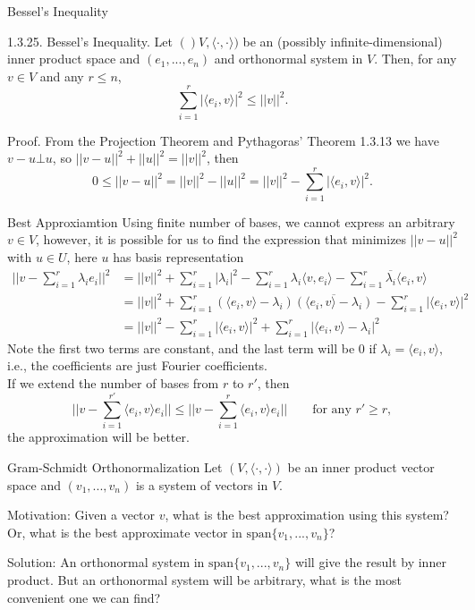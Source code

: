 \documentclass[hyperref={pdfpagelabels=true}]{beamer}
\newcommand{\<}{\langle}
\renewcommand{\>}{\rangle}
\begin{document}
\begin{frame}{Bessel's Inequality}
    \begin{block}{1.3.25. Bessel's Inequality.} Let $()V,\<\cdot,\cdot\>)$ be an (possibly infinite-dimensional) inner product space and $(e_{1},...,e_{n})$ and orthonormal system in $V$. Then, for any $v \in V$ and any $r \leq n$,
        \[\sum_{i = 1}^{r}|\<e_{i},v\>|^{2}\leq ||v||^{2}.\]
    \end{block}
    \begin{block}{Proof.}
        From the Projection Theorem and Pythagoras' Theorem 1.3.13 we have $v-u \bot u$, so $||v-u||^{2}+||u||^{2} = ||v||^{2}$, then
        \[0 \leq ||v-u||^{2} = ||v||^{2}-||u||^{2} = ||v||^{2}-\sum_{i = 1}^{r}|\<e_{i},v\>|^{2}.\]
    \end{block}
\end{frame}
\begin{frame}{Best Approxiamtion}
    Using finite number of bases, we cannot express an arbitrary $v \in V$, however, it is possible for us to find the expression that minimizes $||v-u||^{2}$ with $u \in U$, here $u$ has basis representation
    \[
        \begin{aligned}
            ||v-\sum_{i = 1}^{r}\lambda_{i}e_{i}||^{2}&=||v||^{2}+\sum_{i = 1}^{r}|\lambda_{i}|^{2}-\sum_{i = 1}^{r}\lambda_{i}\<v,e_{i}\>-\sum_{i = 1}^{r}\overline{\lambda_{i}}\<e_{i},v\> \\
            &=||v||^{2}+\sum_{i = 1}^{r}(\<e_{i},v\>-\lambda_{i})\overline{(\<e_{i},v\>-\lambda_{i})}-\sum_{i = 1}^{r}|\<e_{i},v\>|^{2}\\
            &=||v||^{2}-\sum_{i = 1}^{r}|\<e_{i},v\>|^{2} +\sum_{i = 1}^{r}|\<e_{i},v\>-\lambda_{i}|^{2}
        \end{aligned}
    \]
    Note the first two terms are constant, and the last term will be 0 if $\lambda_{i} = \<e_{i},v\>,$ i.e., the coefficients are just Fourier coefficients.\\
    If we extend the number of bases from $r$ to $r'$, then 
    \[||v-\sum_{i = 1}^{r'}\<e_{i},v\>e_{i}||\leq||v-\sum_{i = 1}^{r}\<e_{i},v\>e_{i}||\qquad \text{for any } r' \geq r,\]
    the approximation will be better.
\end{frame}
\begin{frame}{Gram-Schmidt Orthonormalization}
    Let $(V,\<\cdot,\cdot\>)$ be an inner product vector space and $(v_{1},...,v_{n})$ is a system of vectors in $V$.\\
    \begin{block}{Motivation:}
        Given a vector $v$, what is the best approximation using this system? Or, what is the best approximate vector in $\text{span}\{v_{1},...,v_{n}\}$?
    \end{block}
    \begin{block}{Solution:}
        An orthonormal system in $\text{span}\{v_{1},...,v_{n}\}$ will give the result by inner product. But an orthonormal system will be arbitrary, what is the most convenient one we can find?
    \end{block}

\end{frame}
\end{document}

